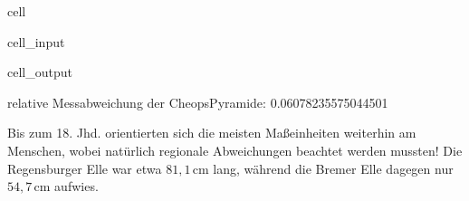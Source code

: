 \documentclass[letterpaper,10pt,english]{jupyterBook}
\begin{document}
\begin{sphinxuseclass}{cell}\begin{sphinxVerbatimInput}

\begin{sphinxuseclass}{cell_input}
\begin{sphinxVerbatim}[commandchars=\\\{\}]
     
            
    
  
\end{sphinxVerbatim}

\end{sphinxuseclass}\end{sphinxVerbatimInput}
\begin{sphinxVerbatimOutput}

\begin{sphinxuseclass}{cell_output}
\begin{sphinxVerbatim}[commandchars=\\\{\}]
relative Messabweichung der Cheops\PYGZhy{}Pyramide:  0.06078235575044501 \PYGZpc{}
\end{sphinxVerbatim}

\end{sphinxuseclass}\end{sphinxVerbatimOutput}

\end{sphinxuseclass}
\sphinxAtStartPar
Bis zum 18. Jhd.  orientierten sich die meisten Maßeinheiten weiterhin am Menschen, wobei natürlich regionale Abweichungen beachtet werden mussten! Die Regensburger Elle war etwa \(81,1\,\mathrm{cm}\) lang, während die Bremer Elle dagegen nur \(54,7\,\mathrm{cm}\) aufwies.
\end{document}
